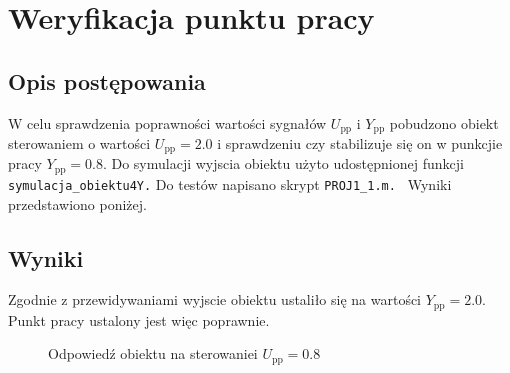 \chapter{Weryfikacja punktu pracy}
\label{zad1}

\section{Opis postępowania}
\label{zad1_opis}
W celu sprawdzenia poprawności wartości sygnałów $U_{\mathrm{pp}}$ i $Y_{\mathrm{pp}}$ pobudzono obiekt sterowaniem
o wartości $U_{\mathrm{pp}}= \num{2.0}$ i sprawdzeniu czy stabilizuje się on w punkcjie pracy  $Y_{\mathrm{pp}}= \num{0.8}$. Do symulacji wyjscia obiektu użyto udostępnionej funkcji 
\verb+symulacja_obiektu4Y.+ Do testów napisano skrypt \verb+PROJ1_1.m. + Wyniki przedstawiono poniżej.

\section{Wyniki}
\label{zad1_wyniki}
Zgodnie z przewidywaniami wyjscie obiektu ustaliło się na wartości $Y_{\mathrm{pp}}= \num{2.0}$. Punkt pracy ustalony jest więc poprawnie.
\begin{figure}[b]

    \label{zad1_1_wykres}
    \centering
    \caption{Odpowiedź obiektu na sterowaniei $U_{\mathrm{pp}}=\num{0.8}$}
\end{figure}